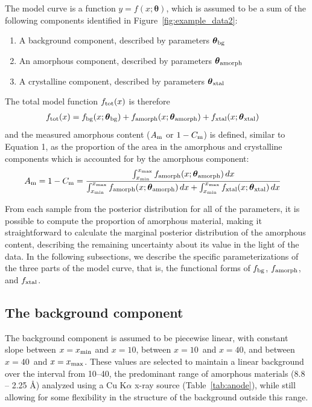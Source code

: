 \documentclass[review]{elsarticle}
\newcommand{\params}{\boldsymbol{\theta}}
\newcommand{\x}{x}
\begin{document}
The model curve is a function $y = f(\x; \params)$,
which is assumed to be a sum of the following components identified in Figure~\ref{fig:example_data2}:
\begin{enumerate}
\item A background component, described by parameters $\params_{\rm bg}$
\item An amorphous component, described by parameters $\params_{\rm amorph}$
\item A crystalline component, described by parameters $\params_{\rm xtal}$
\end{enumerate}
The total model function $f_{\rm tot}(x)$ is therefore
\begin{align}
f_{\rm tot}(\x) &= f_{\rm bg}(\x; \params_{\rm bg})
       + f_{\rm amorph}(\x; \params_{\rm amorph})
       + f_{\rm xtal}(\x; \params_{\rm xtal})
\end{align}
and the measured amorphous content ($A_{\rm m}$ or $1-C_{\rm m}$) is defined, similar to Equation 1, as the proportion of the area in the
amorphous and crystalline components which is accounted for by the amorphous component:
\begin{align}
{A_{\rm m} = 1-C_{\rm m}} &= \frac{\int_{\x_{\rm min}}^{\x_{\rm max}}
            f_{\rm amorph}(\x; \params_{\rm amorph}) \, d\x}
          {\int_{\x_{\rm min}}^{\x_{\rm max}}
            f_{\rm amorph}(\x; \params_{\rm amorph}) \, dx
            + \int_{\x_{\rm min}}^{\x_{\rm max}} f_{\rm xtal}(\x; \params_{\rm xtal}) \, d\x} \label{eqn:crystallinity}
\end{align}

From each sample from the posterior distribution for all of the parameters,
it is possible to compute the proportion of amorphous material, making it straightforward to
calculate the marginal posterior distribution of the amorphous content, describing
the remaining uncertainty about its value in the light of the data.
In the following subsections, we describe the specific parameterizations of the
three parts of the model curve, that is, the functional forms of
$f_{\rm bg}$, $f_{\rm amorph}$, and $f_{\rm xtal}$.

\subsection{The background component}
The background component is assumed to be piecewise linear, with constant
slope
{between $\x=\x_{\rm min}$ and $\x=10$\degree, between $\x=10$\degree~and $\x=40$\degree,
and between $\x=40$\degree~and $\x=\x_{\rm max}$}. These values are selected to maintain a linear background over the interval from 10--40\degree, the predominant range of amorphous materials (8.8 -- 2.25 \AA) analyzed using a Cu K$\alpha$ x-ray source (Table~\ref{tab:anode}), while still allowing for some flexibility in the structure of the background outside this range.
\end{document}
